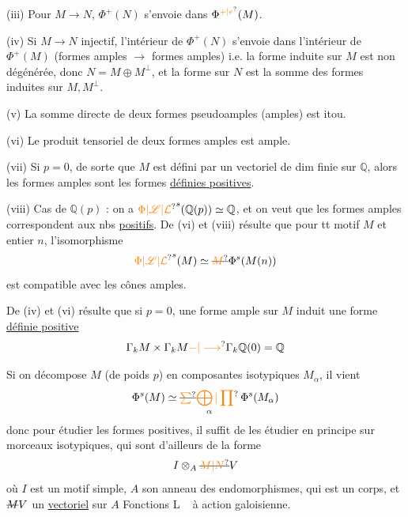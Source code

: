 (iii) Pour $M\to N$, $\Phi^+(N)$ s'envoie dans $\Phi^{\unsure{+|e}}(M)$.

(iv)  Si $M\longrightarrow N$ injectif,  l'intérieur de $\Phi^+(N)$ s'envoie dans l'intérieur de $\Phi^+(M)$ (formes amples $\longrightarrow$ formes amples)
  i.e. la forme induite sur $M$  est non dégénérée, donc $N=M\oplus M^\perp$, et la forme sur $N$ est la somme des formes induites sur $M,M^\perp$.

(v) La somme directe de deux formes  pseudoamples (amples) est itou.

(vi) Le produit tensoriel de deux formes amples est ample.

(vii) Si $p=0$, de sorte que  $M$ est défini par un vectoriel de dim finie sur $\mathbb{Q}$, alors les formes amples sont les formes \uline{définies positives}. 

(viii) Cas de $\mathbb{Q}(p)$ : on a $\unsure{\Phi|\mathscr{L}|\mathcal{L}}^s(\mathbb{Q}(p))\simeq\mathbb{Q}$, et on veut que les formes amples correspondent aux nbs  \uline{positifs}.
De (vi) et (viii) résulte que pour tt motif $M$ et entier $n$, l'isomorphisme
\[
\unsure{\Phi|\mathscr{L}|\mathcal{L}}^s(M)\simeq\deleted{\unsure{M}}\Phi^s(M(n))
\]
est compatible avec les cônes amples.

De (iv) et (vi) résulte que si $p=0$, une forme ample sur $M$ induit une forme \uline{définie positive}
\[
\Gamma_k M\times\Gamma_k M\unsure{\mathbin{-}|\longrightarrow}\Gamma_k\mathbb{Q}(0)=\mathbb{Q}
\]

Si on décompose $M$ (de poids $p$) en composantes isotypiques $M_\alpha$, il vient
\[
\Phi^s(M)\simeq\mathop{\deleted{\unsure{\sum}}\unsure{\bigoplus|\prod}}\limits_\alpha\Phi^s(M_\alpha)
\]
donc pour étudier les formes positives, il suffit de les étudier en principe sur  morceaux isotypiques, qui sont d'ailleurs de la forme
\[
I\otimes_A\deleted{\unsure{M|N}}V
\]
où $I$ est un motif simple, $A$ son anneau des endomorphismes, qui est un corps, et $\deleted{M}V$ un \uline{vectoriel} sur $A$
\qquad Fonctions L \textendash\  à action galoisienne.

